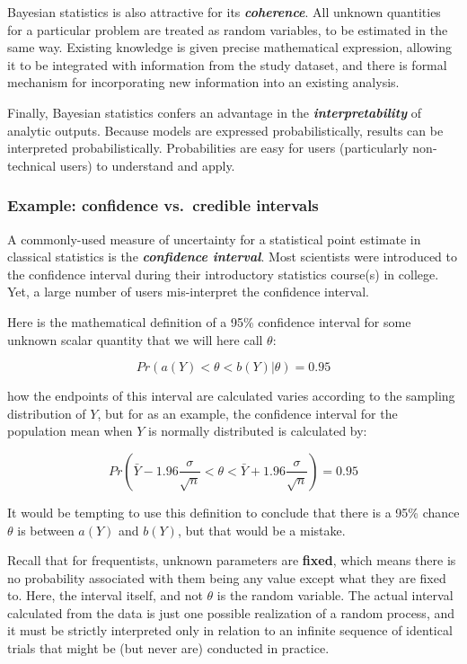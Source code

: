 \documentclass[11pt]{article}
\begin{document}
Bayesian statistics is also attractive for its
\textbf{\emph{coherence}}. All unknown quantities for a particular
problem are treated as random variables, to be estimated in the same
way. Existing knowledge is given precise mathematical expression,
allowing it to be integrated with information from the study dataset,
and there is formal mechanism for incorporating new information into an
existing analysis.

Finally, Bayesian statistics confers an advantage in the
\textbf{\emph{interpretability}} of analytic outputs. Because models are
expressed probabilistically, results can be interpreted
probabilistically. Probabilities are easy for users (particularly
non-technical users) to understand and apply.

    \hypertarget{example-confidence-vs.credible-intervals}{%
\subsubsection{Example: confidence vs.~credible
intervals}\label{example-confidence-vs.credible-intervals}}

A commonly-used measure of uncertainty for a statistical point estimate
in classical statistics is the \textbf{\emph{confidence interval}}. Most
scientists were introduced to the confidence interval during their
introductory statistics course(s) in college. Yet, a large number of
users mis-interpret the confidence interval.

Here is the mathematical definition of a 95\% confidence interval for
some unknown scalar quantity that we will here call \(\theta\):

\[Pr(a(Y) < \theta < b(Y) | \theta) = 0.95\]

how the endpoints of this interval are calculated varies according to
the sampling distribution of \(Y\), but for as an example, the
confidence interval for the population mean when \(Y\) is normally
distributed is calculated by:

\[Pr(\bar{Y} - 1.96\frac{\sigma}{\sqrt{n}}< \theta < \bar{Y} + 1.96\frac{\sigma}{\sqrt{n}}) = 0.95\]

It would be tempting to use this definition to conclude that there is a
95\% chance \(\theta\) is between \(a(Y)\) and \(b(Y)\), but that would
be a mistake.

Recall that for frequentists, unknown parameters are \textbf{fixed},
which means there is no probability associated with them being any value
except what they are fixed to. Here, the interval itself, and not
\(\theta\) is the random variable. The actual interval calculated from
the data is just one possible realization of a random process, and it
must be strictly interpreted only in relation to an infinite sequence of
identical trials that might be (but never are) conducted in practice.
\end{document}
